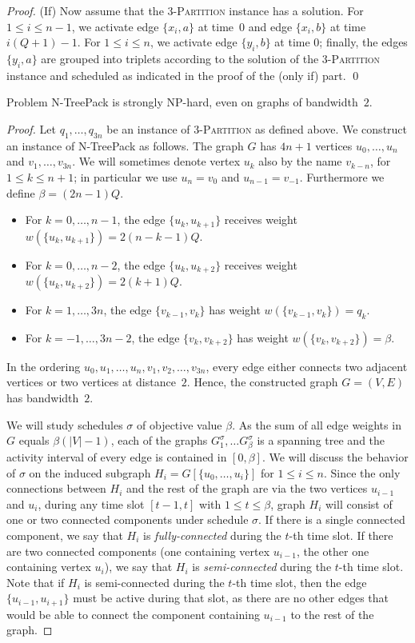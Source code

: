 \documentclass[runningheads]{llncs}
\newcommand{\set}[1]{\{ #1 \}}
\newcommand{\fromto}[2]{\set{#1, \ldots, #2}}
\newcommand{\xxxNTP}{{\sc N-TreePack}}
\begin{document}
\begin{proof}
(If) Now assume that the \textsc{3-Partition} instance has a solution. 
For $1\le i\le n-1$, we activate edge $\set{x_i,a}$ at time~$0$ and edge $\set{x_i,b}$ at time $i(Q+1)-1$.
For $1\le i\le n$, we activate edge $\set{y_i,b}$ at time $0$; finally, the edges $\set{y_i,a}$ are
grouped into triplets according to the solution of the \textsc{3-Partition} instance and scheduled
as indicated in the proof of the (only if) part.
\qed
\end{proof}

\begin{theorem}
\label{thm:hardness_bandwidth}
Problem {\xxxNTP} is strongly NP-hard, even on graphs of bandwidth~$2$.
\end{theorem}
\begin{proof}
Let $q_1,\ldots,q_{3n}$ be an instance of \textsc{3-Partition} as defined above.
We construct an instance of {\xxxNTP} as follows.
The graph $G$ has $4n+1$ vertices $u_0,\ldots,u_n$ and $v_1,\ldots,v_{3n}$.
We will sometimes denote vertex $u_k$ also by the name $v_{k-n}$, for $1\le k\le n+1$;
in particular we use $u_n=v_0$ and $u_{n-1}=v_{-1}$.
Furthermore we define $\beta=(2n-1)Q$.
\begin{itemize}
\item 
For $k=0,\ldots,n-1$,   the edge $\{u_k, u_{k+1}\}$ receives weight $w(\{u_k, u_{k+1}\}) = 2(n-k-1)Q$.
\item
For $k=0,\ldots,n-2$,   the edge $\{u_k, u_{k+2}\}$ receives weight $w(\{u_k, u_{k+2}\})=2(k+1)Q$.
\item 
For $k=1,\ldots,3n$,    the edge $\{v_{k-1}, v_k\}$ has weight $w(\{v_{k-1}, v_k\})=q_k$.
\item
For $k=-1,\ldots,3n-2$, the edge $\{v_k, v_{k+2}\}$ has weight $w(\{v_k, v_{k+2}\})=\beta$.  
\end{itemize}
In the ordering $u_0,u_1,\ldots,u_n,v_1,v_2,\ldots,v_{3n}$, every edge either connects two adjacent 
vertices or two vertices at distance~$2$. Hence, the constructed graph $G=(V,E)$ has bandwidth~$2$. 

We will study schedules $\sigma$ of objective value $\beta$. 
As the sum of all edge weights in $G$ equals $\beta(|V|-1)$, each of the graphs 
$G^\sigma_1, \dots G^\sigma_\beta$ is a spanning tree and the activity interval of every edge is contained in $[0, \beta]$.
We will discuss the behavior of $\sigma$ on the induced subgraph $H_i = G[\fromto{u_0}{u_i}]$ for $1\le i\le n$.
Since the only connections between $H_i$ and the rest of the graph are via the two vertices $u_{i-1}$ and $u_i$,
during any time slot $[t-1,t]$ with $1\le t\le\beta$, graph $H_i$ will consist of one or two connected components
under schedule $\sigma$.
If there is a single connected component, we say that $H_i$ is \emph{fully-connected} during the $t$-th time slot.
If there are two connected components (one containing vertex $u_{i-1}$, the other one containing 
vertex $u_i$), we say that $H_i$ is \emph{semi-connected} during the $t$-th time slot.
Note that if $H_i$ is semi-connected during the $t$-th time slot, then the edge $\{u_{i-1}, u_{i+1}\}$ must be 
active during that slot, as there are no other edges that would be able to connect the component containing 
$u_{i-1}$ to the rest of the graph.


\end{proof}
\end{document}
